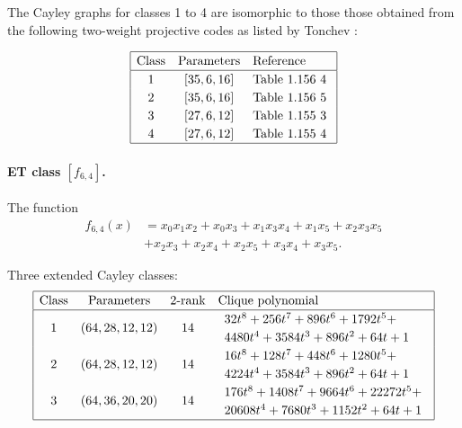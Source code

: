 \documentclass[12pt,a4paper]{article}
\begin{document}
The Cayley graphs for classes 1 to 4 are isomorphic to those those obtained from the following
two-weight projective
codes as listed by Tonchev \cite{Ton07codes}:

\begin{align*}
\begin{array}{|ccl|}
\hline
\text{Class} &
\text{Parameters} & \text{Reference}
\\
\hline
1 & [35,6,16] & \text{Table 1.156 4 }
\\
2 & [35,6,16] & \text{Table 1.156 5 }
\\
3 & [27,6,12] & \text{Table 1.155 3 }
\\
4 & [27,6,12] & \text{Table 1.155 4 }
\\
\hline
\end{array}
\end{align*}

\paragraph*{ET class $[f_{6,4}]$.}

The function
\begin{align*}
f_{6,4}(x) &= x_{0} x_{1} x_{2} + x_{0} x_{3} + x_{1} x_{3} x_{4} + x_{1} x_{5} + x_{2} x_{3} x_{5}
\\
           &+ x_{2} x_{3} + x_{2} x_{4} + x_{2} x_{5} + x_{3} x_{4} + x_{3} x_{5}.
\end{align*}

Three extended Cayley classes:
\small{}
\begin{align*}
\def\arraystretch{1.2}
\begin{array}{|cccl|}
\hline
\text{Class} &
\text{Parameters} &
\text{2-rank} &
\text{Clique polynomial}
\\
\hline
1 &
(64, 28, 12, 12) & 14 &
\begin{array}{l}
32t^{8} + 256t^{7} + 896t^{6} + 1792t^{5} +
\\
4480t^{4} + 3584t^{3} + 896t^{2} + 64t + 1
\end{array}
\\
2 &
(64, 28, 12, 12) & 14 &
\begin{array}{l}
16t^{8} + 128t^{7} + 448t^{6} + 1280t^{5} +
\\
4224t^{4} + 3584t^{3} + 896t^{2} + 64t + 1
\end{array}
\\
3 &
(64, 36, 20, 20) & 14 &
\begin{array}{l}
176t^{8} + 1408t^{7} + 9664t^{6} + 22272t^{5} +
\\
20608t^{4} + 7680t^{3} + 1152t^{2} + 64t + 1
\end{array}
\\
\hline
\end{array}
\end{align*}
\end{document}
